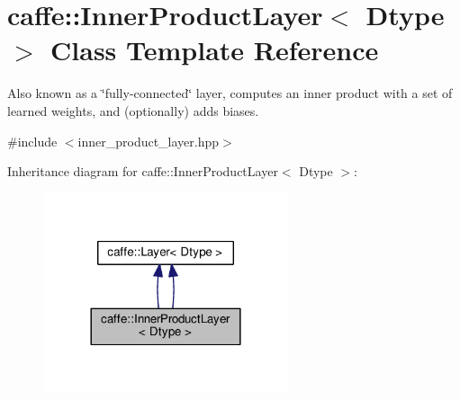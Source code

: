 \hypertarget{classcaffe_1_1_inner_product_layer}{}\section{caffe\+:\+:Inner\+Product\+Layer$<$ Dtype $>$ Class Template Reference}
\label{classcaffe_1_1_inner_product_layer}


Also known as a \char`\"{}fully-\/connected\char`\"{} layer, computes an inner product with a set of learned weights, and (optionally) adds biases.  




{\ttfamily \#include $<$inner\+\_\+product\+\_\+layer.\+hpp$>$}



Inheritance diagram for caffe\+:\+:Inner\+Product\+Layer$<$ Dtype $>$\+:
\nopagebreak
\begin{figure}[H]
\begin{center}
\leavevmode
\includegraphics[width=204pt]{classcaffe_1_1_inner_product_layer__inherit__graph}
\end{center}
\end{figure}
